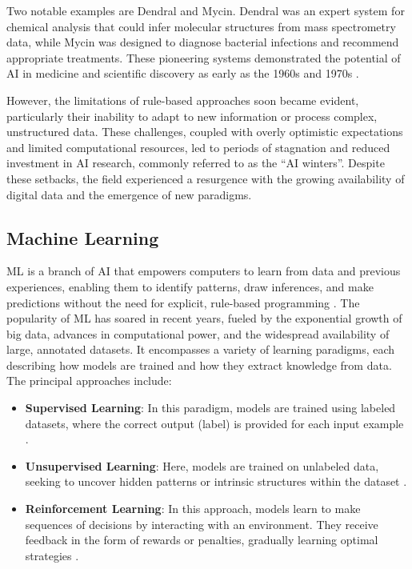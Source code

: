 \documentclass[a4paper,10pt]{book}
\begin{document}
Two notable examples are Dendral and Mycin. Dendral was an expert system for chemical analysis that could infer molecular structures from mass spectrometry data, while Mycin was designed to diagnose bacterial infections and recommend appropriate treatments. These pioneering systems demonstrated the potential of AI in medicine and scientific discovery as early as the 1960s and 1970s \cite{filipsson_evolution_2024}.

However, the limitations of rule-based approaches soon became evident, particularly their inability to adapt to new information or process complex, unstructured data. These challenges, coupled with overly optimistic expectations and limited computational resources, led to periods of stagnation and reduced investment in AI research, commonly referred to as the “AI winters”. Despite these setbacks, the field experienced a resurgence with the growing availability of digital data and the emergence of new paradigms. 

\subsection{Machine Learning}

ML is a branch of AI that empowers computers to learn from data and previous experiences, enabling them to identify patterns, draw inferences, and make predictions without the need for explicit, rule-based programming \cite{noauthor_what_nodate}. The popularity of ML has soared in recent years, fueled by the exponential growth of big data, advances in computational power, and the widespread availability of large, annotated datasets. It encompasses a variety of learning paradigms, each describing how models are trained and how they extract knowledge from data. The principal approaches include:

\begin{itemize}
\item \textbf{Supervised Learning}: In this paradigm, models are trained using labeled datasets, where the correct output (label) is provided for each input example \cite{jiang_supervised_2020}. 
\item \textbf{Unsupervised Learning}: Here, models are trained on unlabeled data, seeking to uncover hidden patterns or intrinsic structures within the dataset \cite{noauthor_unsupervised_nodate}. 
\item \textbf{Reinforcement Learning}: In this approach, models learn to make sequences of decisions by interacting with an environment. They receive feedback in the form of rewards or penalties, gradually learning optimal strategies \cite{ghasemi_introduction_2024}.
\end{itemize}
\end{document}
